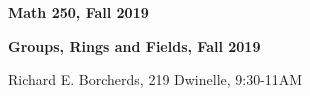 \documentclass[12pt,letterpaper]{article}
\begin{document}
\thispagestyle{empty}
$ $
\vfill
\begin{center}

\centerline{\huge \textbf{Math 250, Fall 2019}}
\centerline{\Large \textbf{Groups, Rings and Fields, Fall 2019}} 
\centerline{Richard E. Borcherds, 219 Dwinelle, 9:30-11AM}
\end{center}
\vfill
$ $
\newpage
\thispagestyle{empty}
\tableofcontents
\newpage
\setcounter{page}{1}


\end{document}
